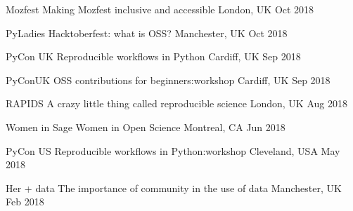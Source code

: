 


\begin{cvpresentations}

\cvpresentation
{Mozfest} %
{Making Mozfest inclusive and accessible} %
{London, UK} %
{Oct 2018} %



\cvpresentation
{PyLadies} %
{Hacktoberfest: what is OSS?} %
{Manchester, UK} %
{Oct 2018} %




\cvpresentation
{PyCon UK} %
{Reproducible workflows in Python}
{Cardiff, UK} %
{Sep 2018} %




\cvpresentation
{PyConUK} %
{OSS contributions for beginners:workshop} %
{Cardiff, UK} %
{Sep 2018} %




\cvpresentation
{RAPIDS} %
{A crazy little thing called reproducible science} %
{London, UK} %
{Aug 2018} %




\cvpresentation
{Women in Sage} %
{Women in Open Science} %
{Montreal, CA} %
{Jun 2018} %




\cvpresentation
{PyCon US} %
{Reproducible workflows in Python:workshop} %
{Cleveland, USA} %
{May 2018} %




\cvpresentation
{Her + data} %
{The importance of community in the use of data} %
{Manchester, UK} %
{Feb 2018} %



\end{cvpresentations}

